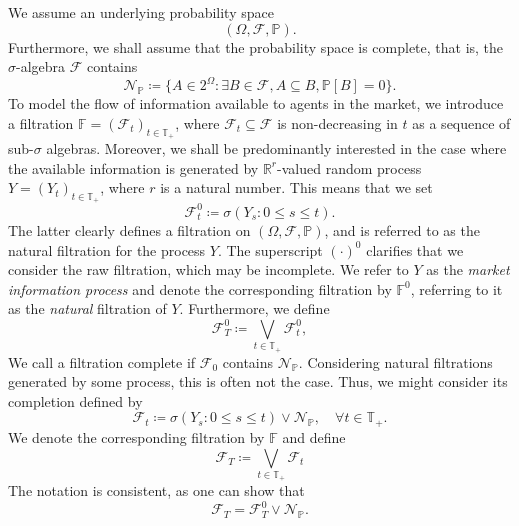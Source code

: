 \documentclass[11pt,a4paper,twoside,openany]{report}
\numberwithin{equation}{section}
\theoremstyle{plain} %
\theoremstyle{definition} %
\theoremstyle{remark} %
\begin{document}
We assume an underlying probability space 
\begin{equation*}
    (\Omega,\mathcal{F},\mathbb{P}).
\end{equation*}
Furthermore, we shall assume that the probability space is complete, that is, the \(\sigma\)-algebra \(\mathcal{F}\) contains 
\begin{equation}\label{eq:nullsets}
    \mathcal{N}_{\mathbb{P}}\coloneqq\Big\{A\in2^{\Omega}:\exists B\in\mathcal{F}, A\subseteq B, \mathbb{P}[B]=0\Big\}.
\end{equation} 
To model the flow of information available to agents in the market, we introduce a filtration  \(\mathbb{F}=(\mathcal{F}_t)_{t\in \mathbb{T}_+}\), where
\(\mathcal{F}_t\subseteq\mathcal{F}\) is non-decreasing in \(t\) as a sequence of sub-\(\sigma\) algebras.
Moreover, we shall be predominantly interested in the case where the available information is generated by \(\mathbb{R}^{r}\)-valued random process \(Y=(Y_t)_{t\in \mathbb{T}_+}\), where \(r\) is a natural number. This means that we set 
\begin{equation*}
    \mathcal{F}^0_t\coloneqq\sigma(Y_s:0\leq s\leq t).
\end{equation*}
The latter clearly defines a filtration on \((\Omega,\mathcal{F},\mathbb{P})\), and is referred to as the natural filtration for the process \(Y\). The superscript \((\cdot)^0\) clarifies that we consider the raw filtration, which may be incomplete. 
We refer to \(Y\) as the \textit{market information process} and denote the corresponding filtration by \(\mathbb{F}^0\), referring to it as the \textit{natural} filtration of \(Y\). Furthermore, we define 
\begin{equation*}
    \mathcal{F}_T^0\coloneqq\bigvee_{t\in\mathbb{T}_+}\mathcal{F}_t^0,
\end{equation*}
We call a filtration complete if \(\mathcal{F}_0\) contains \(\mathcal{N}_{\mathbb{P}}\). Considering natural filtrations generated by some process, this is often not the case.
Thus, we might consider its completion defined by 
\begin{equation}\label{eq:completed filtration}
    \mathcal{F}_t\coloneqq\sigma(Y_s:0\leq s\leq t)\vee \mathcal{N}_{\mathbb{P}},\quad\forall t\in\mathbb{T}_+.
\end{equation}
We denote the corresponding filtration by \(\mathbb{F}\) and define
\begin{equation*}
    \mathcal{F}_{T}\coloneqq \bigvee_{t\in\mathbb{T}_+}\mathcal{F}_t
\end{equation*}
The notation is consistent, as one can show that 
\begin{equation*}
    \mathcal{F}_T=\mathcal{F}^0_T\vee\mathcal{N}_{\mathbb{P}}. 
\end{equation*}
\end{document}

